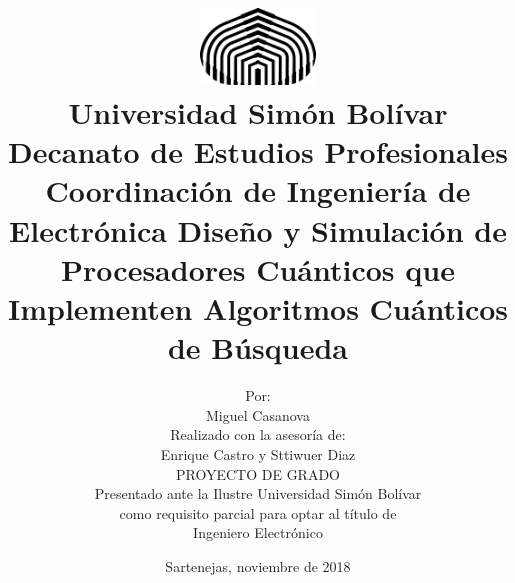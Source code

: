 \begin{titlepage}
    \title{\vspace{-2cm} \includegraphics[width=1.2in]{./usb.png} \\[.2cm]
        \large Universidad Simón Bolívar \\
        Decanato de Estudios Profesionales \\
        Coordinación de Ingeniería de Electrónica
        \vfill \LARGE Diseño y Simulación de Procesadores Cuánticos que Implementen Algoritmos Cuánticos de Búsqueda \vfill}
    \author{Por: \\
        Miguel Casanova \\
        Realizado con la asesoría de: \\
        Enrique Castro y Sttiwuer Diaz \\[1.2cm]
        PROYECTO DE GRADO \\
Presentado ante la Ilustre Universidad Simón Bolívar \\
como requisito parcial para optar al título de \\
Ingeniero Electrónico}
    \date{Sartenejas, noviembre de 2018}
\end{titlepage}
